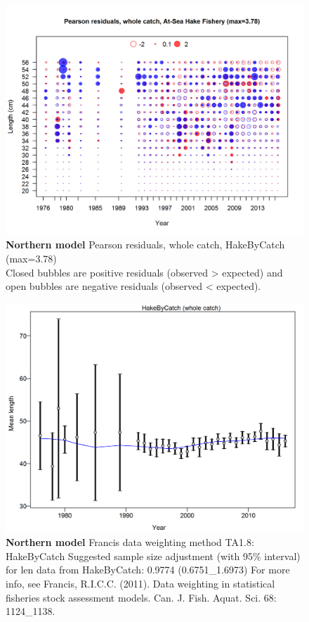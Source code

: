 \documentclass[12pt,]{article}
\begin{document}
\begin{figure}[htbp]
\centering
\includegraphics{./r4ss/plots_mod1/comp_lenfit_residsflt2mkt0.png}
\caption{\textbf{Northern model} Pearson residuals, whole catch,
HakeByCatch (max=3.78)\\
Closed bubbles are positive residuals (observed \textgreater{} expected)
and open bubbles are negative residuals (observed \textless{} expected).
\label{fig:mod1_11_comp_lenfit_residsflt2mkt0}}
\end{figure}

\begin{figure}[htbp]
\centering
\includegraphics{./r4ss/plots_mod1/comp_lenfit_data_weighting_TA1.8_HakeByCatch.png}
\caption{\textbf{Northern model} Francis data weighting method TA1.8:
HakeByCatch Suggested sample size adjustment (with 95\% interval) for
len data from HakeByCatch: 0.9774 (0.6751\_1.6973) For more info, see
Francis, R.I.C.C. (2011). Data weighting in statistical fisheries stock
assessment models. Can. J. Fish. Aquat. Sci. 68: 1124\_1138.
\label{fig:mod1_13_comp_lenfit_data_weighting_TA1.8_HakeByCatch}}
\end{figure}
\end{document}
